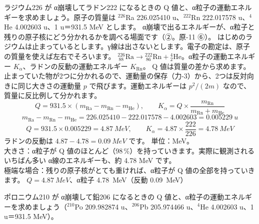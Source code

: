 {}

\label{ph:原-12:ex1}
\begin{phreidai}
ラジウム226 が α崩壊してラドン222 になるときの Q 値と、α粒子の運動エネルギーを求めましょう。原子の質量は ${}^{226}$Ra 226.025410 u、${}^{222}$Rn 222.017578 u、${}^4$He 4.002603 u、1 u＝931.5 MeV とします。
\phbamen
α崩壊で出るエネルギーが、α粒子と残りの原子核にどう分かれるかを調べる場面です（②。原-11 ⑥）。
\phmushi
はじめのラジウムは止まっているとします。γ線は出さないとします。電子の勘定は、原子の質量を使えば左右でそろいます。
\phzu
${}^{226}_{\ 88}\mathrm{Ra}\to{}^{222}_{\ 86}\mathrm{Rn}+{}^4_2\mathrm{He}$。α粒子の運動エネルギー $K_\alpha$、ラドンの反動の運動エネルギー $K_{\mathrm{Rn}}$。
\phriyu
Q 値は質量の差から求めます。止まっていた物が2つに分かれるので、運動量の保存（力-3）から、2つは反対向きに同じ大きさの運動量 $p$ で飛びます。運動エネルギーは $p^2/(2m)$ なので、質量に反比例して分かれます。
\phtateru
\[ Q=931.5\times(m_{\mathrm{Ra}}-m_{\mathrm{Rn}}-m_{\mathrm{He}}),\qquad K_\alpha=Q\times\frac{m_{\mathrm{Rn}}}{m_{\mathrm{Rn}}+m_{\mathrm{He}}} \]
\phtoku
\[ m_{\mathrm{Ra}}-m_{\mathrm{Rn}}-m_{\mathrm{He}}=226.025410-222.017578-4.002603=\qty{0.005229}{u} \]
\[ Q=931.5\times0.005229=\qty{4.87}{MeV},\qquad K_\alpha=4.87\times\frac{222}{226}=\qty{4.78}{MeV} \]
ラドンの反動は $4.87-4.78=\qty{0.09}{MeV}$ です。
\phtashikame
単位：MeV。\\
大きさ：α粒子が Q 値のほとんど（98\,\%）を持っていきます。実際に観測されるいちばん多い α線のエネルギーも、約 4.78 MeV です。\\
極端な場合：残りの原子核がとても重ければ、α粒子が Q 値の全部を持っていきます。
\kotae $Q=\qty{4.87}{MeV}$、α粒子 \qty{4.78}{MeV}（反動 \qty{0.09}{MeV}）
\end{phreidai}
\begin{jibun}
ポロニウム210 が α崩壊して鉛206 になるときの Q 値と、α粒子の運動エネルギーを求めましょう（${}^{210}$Po 209.982874 u、${}^{206}$Pb 205.974466 u、${}^4$He 4.002603 u、1 u＝931.5 MeV）。
\end{jibun}

